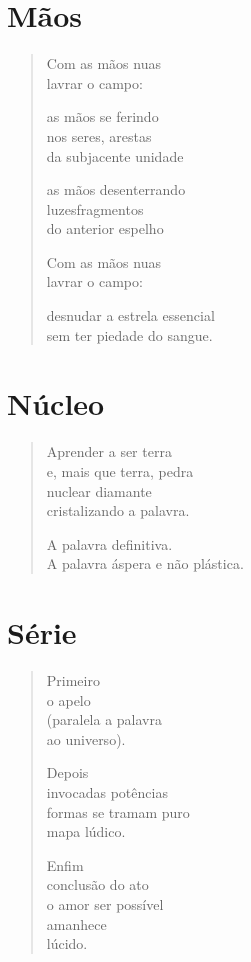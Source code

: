 \chapter{Mãos}

\begin{verse}
Com as mãos nuas\\
lavrar o campo:

as mãos se ferindo\\
nos seres, arestas\\
da subjacente unidade

as mãos desenterrando\\
luzesfragmentos\\
do anterior espelho

Com as mãos nuas\\
lavrar o campo:

desnudar a estrela essencial\\
sem ter piedade do sangue.
\end{verse}

\chapter{Núcleo}

\begin{verse}
Aprender a ser terra\\
e, mais que terra, pedra\\
nuclear diamante\\
cristalizando a palavra.

A palavra definitiva.\\
A palavra áspera e não plástica.
\end{verse}


\chapter{Série}

\begin{verse}
Primeiro\\
o apelo\\
(paralela a palavra\\
ao universo).

Depois\\
invocadas potências\\
formas se tramam puro\\
mapa lúdico.

Enfim\\
conclusão do ato\\
o amor ser possível\\
amanhece\\
lúcido.
\end{verse}

